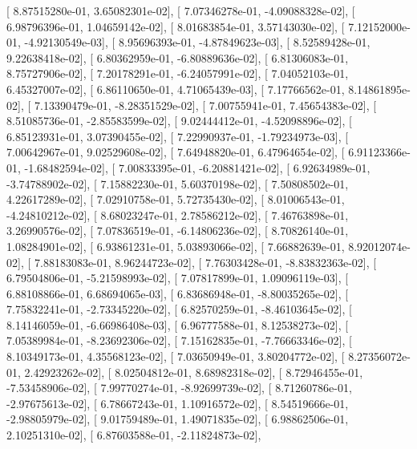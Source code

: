 \documentclass{article}
\begin{document}
       [  8.87515280e-01,   3.65082301e-02],
       [  7.07346278e-01,  -4.09088328e-02],
       [  6.98796396e-01,   1.04659142e-02],
       [  8.01683854e-01,   3.57143030e-02],
       [  7.12152000e-01,  -4.92130549e-03],
       [  8.95696393e-01,  -4.87849623e-03],
       [  8.52589428e-01,   9.22638418e-02],
       [  6.80362959e-01,  -6.80889636e-02],
       [  6.81306083e-01,   8.75727906e-02],
       [  7.20178291e-01,  -6.24057991e-02],
       [  7.04052103e-01,   6.45327007e-02],
       [  6.86110650e-01,   4.71065439e-03],
       [  7.17766562e-01,   8.14861895e-02],
       [  7.13390479e-01,  -8.28351529e-02],
       [  7.00755941e-01,   7.45654383e-02],
       [  8.51085736e-01,  -2.85583599e-02],
       [  9.02444412e-01,  -4.52098896e-02],
       [  6.85123931e-01,   3.07390455e-02],
       [  7.22990937e-01,  -1.79234973e-03],
       [  7.00642967e-01,   9.02529608e-02],
       [  7.64948820e-01,   6.47964654e-02],
       [  6.91123366e-01,  -1.68482594e-02],
       [  7.00833395e-01,  -6.20881421e-02],
       [  6.92634989e-01,  -3.74788902e-02],
       [  7.15882230e-01,   5.60370198e-02],
       [  7.50808502e-01,   4.22617289e-02],
       [  7.02910758e-01,   5.72735430e-02],
       [  8.01006543e-01,  -4.24810212e-02],
       [  8.68023247e-01,   2.78586212e-02],
       [  7.46763898e-01,   3.26990576e-02],
       [  7.07836519e-01,  -6.14806236e-02],
       [  8.70826140e-01,   1.08284901e-02],
       [  6.93861231e-01,   5.03893066e-02],
       [  7.66882639e-01,   8.92012074e-02],
       [  7.88183083e-01,   8.96244723e-02],
       [  7.76303428e-01,  -8.83832363e-02],
       [  6.79504806e-01,  -5.21598993e-02],
       [  7.07817899e-01,   1.09096119e-03],
       [  6.88108866e-01,   6.68694065e-03],
       [  6.83686948e-01,  -8.80035265e-02],
       [  7.75832241e-01,  -2.73345220e-02],
       [  6.82570259e-01,  -8.46103645e-02],
       [  8.14146059e-01,  -6.66986408e-03],
       [  6.96777588e-01,   8.12538273e-02],
       [  7.05389984e-01,  -8.23692306e-02],
       [  7.15162835e-01,  -7.76663346e-02],
       [  8.10349173e-01,   4.35568123e-02],
       [  7.03650949e-01,   3.80204772e-02],
       [  8.27356072e-01,   2.42923262e-02],
       [  8.02504812e-01,   8.68982318e-02],
       [  8.72946455e-01,  -7.53458906e-02],
       [  7.99770274e-01,  -8.92699739e-02],
       [  8.71260786e-01,  -2.97675613e-02],
       [  6.78667243e-01,   1.10916572e-02],
       [  8.54519666e-01,  -2.98805979e-02],
       [  9.01759489e-01,   1.49071835e-02],
       [  6.98862506e-01,   2.10251310e-02],
       [  6.87603588e-01,  -2.11824873e-02],
\end{document}
